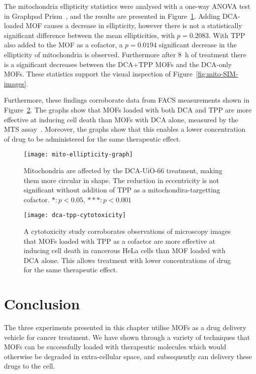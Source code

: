 The mitochondria ellipticity statistics were analysed with a one-way ANOVA test in Graphpad Prism~\cite{graphpadprism}, and the results are presented in Figure~\ref{fig:mito-ellipticity-graph}. 
Adding DCA-loaded MOF causes a decrease in ellipticity, however there is not a statistically significant difference between the mean ellipticities, with $p=0.2083$. 
With TPP also added to the MOF as a cofactor, a $p=0.0194$ significant decrease in the ellipticity of mitochondria is observed. 
Furthermore after \SI{8}{\hour} of treatment there is a significant decreases between the DCA+TPP MOFs and the DCA-only MOFs. 
These statistics support the visual inspection of Figure~\ref{fig:mito-SIM-images}. 

Furthermore, these findings corroborate data from FACS measurements shown in Figure~\ref{fig:dca-tpp-cytotoxicity}. 
The graphs show that MOFs loaded with both DCA and TPP are more effective at inducing cell death than MOFs with DCA alone, measured by the MTS assay~\cite{mosmann1983rapid, mtsassay}. 
Moreover, the graphs show that this enables a lower concentration of drug to be administered for the same therapeutic effect.

\begin{figure}[htbp!]
\centering
\texttt{[image: mito-ellipticity-graph]}
\caption[MOFs: Mitochondria become more circular when treated with ] {Mitochondria are affected by the DCA-UiO-66 treatment, making them more circular in shape. The reduction in eccentricity is not significant without addition of TPP as a mitochondira-targetting cofactor. $*: p<0.05$, $***: p<0.001$} 
\label{fig:mito-ellipticity-graph}
\end{figure}

\begin{figure}[htbp!]
\centering
\texttt{[image: dca-tpp-cytotoxicity]}
\caption[MOFs: Loading MOFs with TPP as a cofactor facilitates lower drug concentration] {A cytotoxicity study corroborates observations of microscopy images that MOFs loaded with TPP as a cofactor are more effective at inducing cell death in cancerous HeLa cells than MOF loaded with DCA alone. This allows treatment with lower concentrations of drug for the same therapeutic effect.} 
\label{fig:dca-tpp-cytotoxicity}
\end{figure}


\section{Conclusion} \label{sec:mof-conclusion}
The three experiments presented in this chapter utilise MOFs as a drug delivery vehicle for cancer treatment. 
We have shown through a variety of techniques that MOFs can be successfully loaded with therapeutic molecules which would otherwise be degraded in extra-cellular space, and subsequently can delivery these drugs to the cell. 

